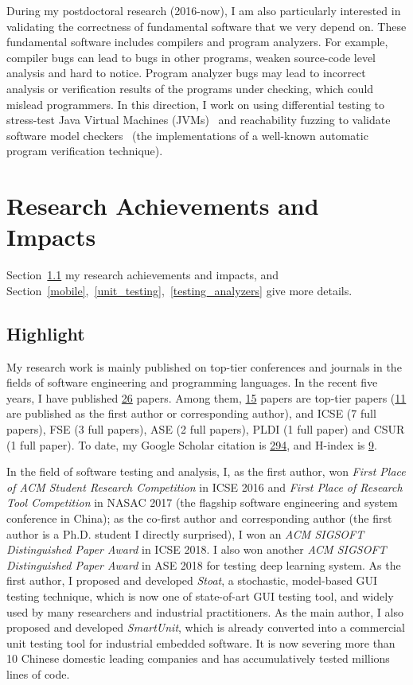\documentclass[a4paper]{article}
\begin{document}
During my postdoctoral research (2016-now), I am also particularly interested in validating the correctness of fundamental software that we very depend on. These fundamental software includes compilers and program analyzers. For example, compiler bugs can lead to bugs in other programs, weaken source-code level analysis and hard to notice. Program analyzer bugs may lead to incorrect analysis or verification results of the programs under checking, which could mislead programmers. In this direction, I work on using differential testing to stress-test Java Virtual Machines (JVMs)~\cite{classfuzz,classming} and reachability fuzzing to validate software model checkers~\cite{mcfuzz} (the implementations of a well-known automatic program verification technique). 


\section{Research Achievements and Impacts}

Section~\ref{highlight} my research achievements and impacts, and Section~\ref{mobile},~\ref{unit_testing},~\ref{testing_analyzers} give more details.

\subsection{Highlight}
\label{highlight}

My research work is mainly published on top-tier conferences and journals in the fields of software engineering and programming languages. In the recent five years, I have published \underline{26} papers. Among them, \underline{15} papers are top-tier papers (\underline{11} are published as the first author or corresponding author), and ICSE (7 full papers), FSE (3 full papers), ASE (2 full papers), PLDI (1 full paper) and CSUR (1 full paper). To date, my Google Scholar citation is \underline{294}, and H-index is \underline{9}.

In the field of software testing and analysis, I, as the first author, won \emph{First Place of ACM Student Research Competition} in ICSE 2016 and \emph{First Place of Research Tool Competition} in NASAC 2017 (the flagship software engineering and system conference in China); as the co-first author and corresponding author (the first author is a Ph.D. student I directly surprised), I won an \emph{ACM SIGSOFT Distinguished Paper Award} in ICSE 2018. I also won another \emph{ACM SIGSOFT Distinguished Paper Award} in ASE 2018 for testing deep learning system. As the first author, I proposed and developed \emph{Stoat}, a stochastic, model-based GUI testing technique, which is now one of state-of-art GUI testing tool, and widely used by many researchers and industrial practitioners.
As the main author, I also proposed and developed \emph{SmartUnit}, which is already converted into a commercial unit testing tool for industrial embedded software. It is now severing more than 10 Chinese domestic leading companies and has accumulatively tested millions lines of code.
\end{document}
